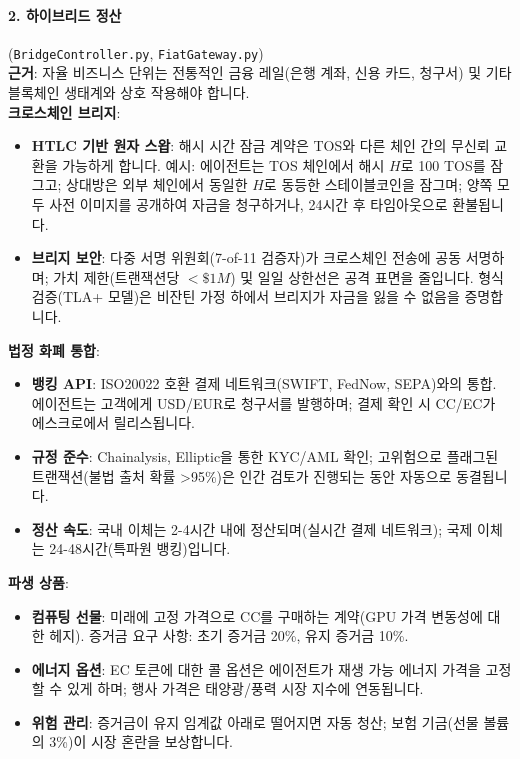 \documentclass[11pt]{article}
\begin{document}
\paragraph{2. 하이브리드 정산} (\texttt{BridgeController.py}, \texttt{FiatGateway.py})\\
\textbf{근거}: 자율 비즈니스 단위는 전통적인 금융 레일(은행 계좌, 신용 카드, 청구서) 및 기타 블록체인 생태계와 상호 작용해야 합니다.\\
\textbf{크로스체인 브리지}:
\begin{itemize}[noitemsep]
  \item \textbf{HTLC 기반 원자 스왑}: 해시 시간 잠금 계약은 TOS와 다른 체인 간의 무신뢰 교환을 가능하게 합니다. 예시: 에이전트는 TOS 체인에서 해시 $H$로 100 TOS를 잠그고; 상대방은 외부 체인에서 동일한 $H$로 동등한 스테이블코인을 잠그며; 양쪽 모두 사전 이미지를 공개하여 자금을 청구하거나, 24시간 후 타임아웃으로 환불됩니다.
  \item \textbf{브리지 보안}: 다중 서명 위원회(7-of-11 검증자)가 크로스체인 전송에 공동 서명하며; 가치 제한(트랜잭션당 $<\$1M$) 및 일일 상한선은 공격 표면을 줄입니다. 형식 검증(TLA+ 모델)은 비잔틴 가정 하에서 브리지가 자금을 잃을 수 없음을 증명합니다.
\end{itemize}
\textbf{법정 화폐 통합}:
\begin{itemize}[noitemsep]
  \item \textbf{뱅킹 API}: ISO20022 호환 결제 네트워크(SWIFT, FedNow, SEPA)와의 통합. 에이전트는 고객에게 USD/EUR로 청구서를 발행하며; 결제 확인 시 CC/EC가 에스크로에서 릴리스됩니다.
  \item \textbf{규정 준수}: Chainalysis, Elliptic을 통한 KYC/AML 확인; 고위험으로 플래그된 트랜잭션(불법 출처 확률 >95\%)은 인간 검토가 진행되는 동안 자동으로 동결됩니다.
  \item \textbf{정산 속도}: 국내 이체는 2-4시간 내에 정산되며(실시간 결제 네트워크); 국제 이체는 24-48시간(특파원 뱅킹)입니다.
\end{itemize}
\textbf{파생 상품}:
\begin{itemize}[noitemsep]
  \item \textbf{컴퓨팅 선물}: 미래에 고정 가격으로 CC를 구매하는 계약(GPU 가격 변동성에 대한 헤지). 증거금 요구 사항: 초기 증거금 20\%, 유지 증거금 10\%.
  \item \textbf{에너지 옵션}: EC 토큰에 대한 콜 옵션은 에이전트가 재생 가능 에너지 가격을 고정할 수 있게 하며; 행사 가격은 태양광/풍력 시장 지수에 연동됩니다.
  \item \textbf{위험 관리}: 증거금이 유지 임계값 아래로 떨어지면 자동 청산; 보험 기금(선물 볼륨의 3\%)이 시장 혼란을 보상합니다.
\end{itemize}
\end{document}
